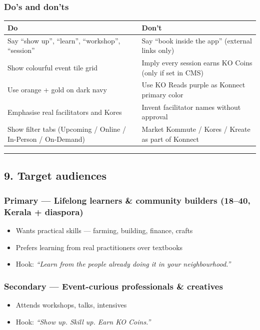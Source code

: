 \documentclass[11pt,a4paper]{report}
\begin{document}
\subsubsection{Do’s and don’ts}

\begin{longtable}{|l|l|}
\hline
Do & Don’t \\ \hline
Say “show up”, “learn”, “workshop”, “session” & Say “book inside the app” (external links only) \\ \hline
Show colourful event tile grid & Imply every session earns KO Coins (only if set in CMS) \\ \hline
Use orange + gold on dark navy & Use KO Reads purple as Konnect primary color \\ \hline
Emphasise real facilitators and Kores & Invent facilitator names without approval \\ \hline
Show filter tabs (Upcoming / Online / In-Person / On-Demand) & Market Kommute / Kores / Kreate as part of Konnect \\
\hline
\end{longtable}


\medskip\hrule\medskip

\subsection{9. Target audiences}

\subsubsection{Primary --- Lifelong learners \& community builders (18--40, Kerala + diaspora)}
\begin{itemize}
  \item Wants practical skills --- farming, building, finance, crafts
  \item Prefers learning from real practitioners over textbooks
  \item Hook: \textit{“Learn from the people already doing it in your neighbourhood.”}
\end{itemize}

\subsubsection{Secondary --- Event-curious professionals \& creatives}
\begin{itemize}
  \item Attends workshops, talks, intensives
  \item Hook: \textit{“Show up. Skill up. Earn KO Coins.”}
\end{itemize}
\end{document}
